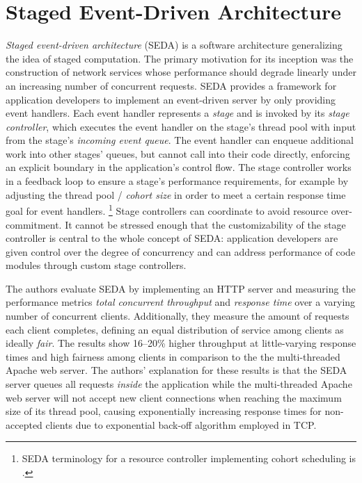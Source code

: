\documentclass[12pt,a4paper]{book}
\begin{document}
\section{Staged Event-Driven Architecture}\label{ch:relwork:seda}
\emph{Staged event-driven architecture} (SEDA) is a software architecture generalizing the idea of staged computation.
The primary motivation for its inception was the construction of network services whose performance should degrade linearly under an increasing number of concurrent requests.
SEDA provides a framework for application developers to implement an event-driven server by only providing event handlers.
Each event handler represents a \emph{stage} and is invoked by its \emph{stage controller}, which executes the event handler on the stage's thread pool with input from the stage's \emph{incoming event queue}.
The event handler can enqueue additional work into other stages' queues, but cannot call into their code directly, enforcing an explicit boundary in the application's control flow.
The stage controller works in a feedback loop to ensure a stage's performance requirements, for example by adjusting the thread pool / \emph{cohort size} in order to meet a certain response time goal for event handlers.%
\footnote{SEDA terminology for a resource controller implementing cohort scheduling is .}
Stage controllers can coordinate to avoid resource over-commitment.
It cannot be stressed enough that the customizability of the stage controller is central to the whole concept of SEDA:
application developers are given control over the degree of concurrency and can address performance of code modules through custom stage controllers.~\cite{seda}

The authors evaluate SEDA by implementing an HTTP server and measuring the performance metrics \emph{total concurrent throughput} and \emph{response time} over a varying number of concurrent clients.
Additionally, they measure the amount of requests each client completes, defining an equal distribution of service among clients as ideally \emph{fair}. %
The results show 16--20\% higher throughput at little-varying response times and high fairness among clients in comparison to the the multi-threaded Apache web server. %
The authors' explanation for these results is that the SEDA server queues all requests \emph{inside} the application while the multi-threaded Apache web server will not accept new client connections when reaching the maximum size of its thread pool, causing exponentially increasing response times for non-accepted clients due to exponential back-off algorithm employed in TCP.~\cite{seda}
\end{document}
